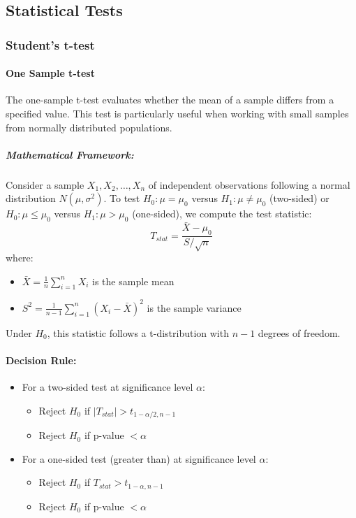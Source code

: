 \documentclass[11pt,a4paper]{article}
\begin{document}
\subsection{Statistical Tests}
\subsubsection{Student's t-test}

\paragraph{One Sample t-test}  
The one-sample t-test evaluates whether the mean of a sample differs from a specified value. This test is particularly useful when working with small samples from normally distributed populations.

\subparagraph{Mathematical Framework:}  

Consider a sample $X_1, X_2, \ldots, X_n$ of independent observations following a normal distribution $N(\mu, \sigma^2)$. To test $H_0: \mu = \mu_0$ versus $H_1: \mu \neq \mu_0$ (two-sided) or $H_0: \mu \leq \mu_0$ versus $H_1: \mu > \mu_0$ (one-sided), we compute the test statistic:
\begin{equation}
T_{stat} = \frac{\bar{X} - \mu_0}{S/\sqrt{n}}
\end{equation}
where:
\begin{itemize}
  \item $\bar{X} = \frac{1}{n}\sum_{i=1}^n X_i$ is the sample mean
  \item $S^2 = \frac{1}{n-1}\sum_{i=1}^n (X_i - \bar{X})^2$ is the sample variance
\end{itemize}

Under $H_0$, this statistic follows a t-distribution with $n-1$ degrees of freedom.

\paragraph{Decision Rule:}
\begin{itemize}
  \item For a two-sided test at significance level $\alpha$:
    \begin{itemize}
      \item Reject $H_0$ if $|T_{stat}| > t_{1-\alpha/2, n-1}$
      \item Reject $H_0$ if p-value $< \alpha$
    \end{itemize}
  \item For a one-sided test (greater than) at significance level $\alpha$:
    \begin{itemize}
      \item Reject $H_0$ if $T_{stat} > t_{1-\alpha, n-1}$
      \item Reject $H_0$ if p-value $< \alpha$
    \end{itemize}
\end{itemize}
\end{document}
